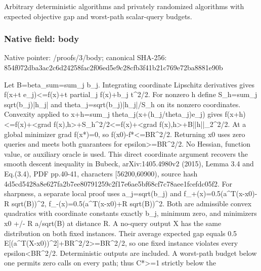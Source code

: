 \documentclass[10pt,a4paper]{article}
\begin{document}
\begingroup\raggedright\sloppy Arbitrary deterministic algorithms and privately randomized algorithms with expected objective gap and worst-path scalar-query budgets.\par\endgroup

\subsubsection{Native field: body}
Native pointer: /proofs/3/body; canonical SHA-256: 854f072dba3ac2c6d24258fac2f06ed5e9c28cfb3f41b21c769e72ba8881e90b

\begingroup\raggedright\sloppy Let B=\allowbreak{}beta\_\allowbreak{}sum=\allowbreak{}sum\_\allowbreak{}j b\_\allowbreak{}j. Integrating coordinate Lipschitz derivatives gives f(x+t e\_\allowbreak{}j)<=\allowbreak{}f(x)+t partial\_\allowbreak{}j f(x)+b\_\allowbreak{}j t\textasciicircum{}2/\allowbreak{}2. For nonzero h define S\_\allowbreak{}h=\allowbreak{}sum\_\allowbreak{}j sqrt(b\_\allowbreak{}j)|h\_\allowbreak{}j| and theta\_\allowbreak{}j=\allowbreak{}sqrt(b\_\allowbreak{}j)|h\_\allowbreak{}j|/\allowbreak{}S\_\allowbreak{}h on its nonzero coordinates. Convexity applied to x+h=\allowbreak{}sum\_\allowbreak{}j theta\_\allowbreak{}j(x+(h\_\allowbreak{}j/\allowbreak{}theta\_\allowbreak{}j)e\_\allowbreak{}j) gives f(x+h)<=\allowbreak{}f(x)+<grad f(x),\allowbreak{}h>+S\_\allowbreak{}h\textasciicircum{}2/\allowbreak{}2<=\allowbreak{}f(x)+<grad f(x),\allowbreak{}h>+B||h||\_\allowbreak{}2\textasciicircum{}2/\allowbreak{}2. At a global minimizer grad f(x*)=\allowbreak{}0,\allowbreak{} so f(x0)-f*<=\allowbreak{}BR\textasciicircum{}2/\allowbreak{}2. Returning x0 uses zero queries and meets both guarantees for epsilon>=\allowbreak{}BR\textasciicircum{}2/\allowbreak{}2. No Hessian,\allowbreak{} function value,\allowbreak{} or auxiliary oracle is used. This direct coordinate argument recovers the smooth descent inequality in Bubeck,\allowbreak{} arXiv:\allowbreak{}1405.4980v2 (2015),\allowbreak{} Lemma 3.4 and Eq.(3.4),\allowbreak{} PDF pp.40-41,\allowbreak{} characters [56200,\allowbreak{}60900),\allowbreak{} source hash 4d5cd5428a8e627fa2b7ee80791259c2f17e6ae5bf68cf7c78aee1fcefdc05f2. For sharpness,\allowbreak{} a separate local proof uses a\_\allowbreak{}j=\allowbreak{}sqrt(b\_\allowbreak{}j) and f\_\allowbreak{}+(x)=\allowbreak{}0.5(a\textasciicircum{}T(x-x0)-R sqrt(B))\textasciicircum{}2,\allowbreak{} f\_\allowbreak{}-(x)=\allowbreak{}0.5(a\textasciicircum{}T(x-x0)+R sqrt(B))\textasciicircum{}2. Both are admissible convex quadratics with coordinate constants exactly b\_\allowbreak{}j,\allowbreak{} minimum zero,\allowbreak{} and minimizers x0 +/\allowbreak{}- R a/\allowbreak{}sqrt(B) at distance R. A no-query output X has the same distribution on both fixed instances. Their average expected gap equals 0.5 E[(a\textasciicircum{}T(X-x0))\textasciicircum{}2]+BR\textasciicircum{}2/\allowbreak{}2>=\allowbreak{}BR\textasciicircum{}2/\allowbreak{}2,\allowbreak{} so one fixed instance violates every epsilon<BR\textasciicircum{}2/\allowbreak{}2. Deterministic outputs are included. A worst-path budget below one permits zero calls on every path;\allowbreak{} thus C*>=\allowbreak{}1 strictly below the 
\end{document}
